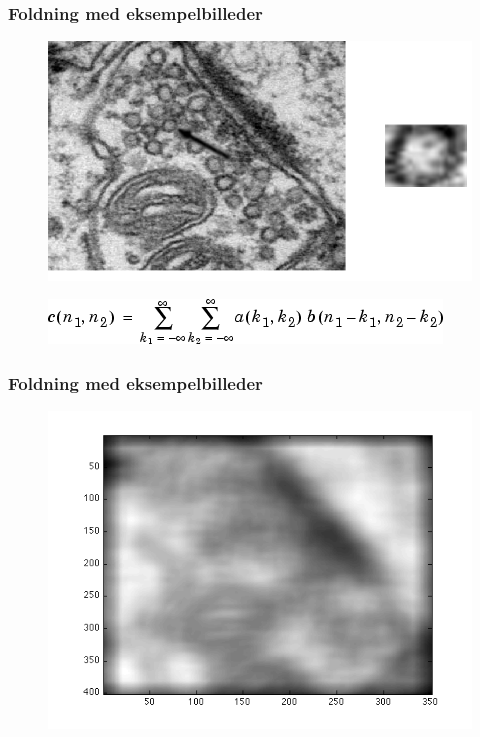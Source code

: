 \begin{frame}
\frametitle{Foldning med eksempelbilleder}
\begin{figure}[H]
	\centering
	\includegraphics[scale=0.4]{img/finalmethod/cell2.png}
\end{figure}
\begin{figure}[H]
	\centering
	\includegraphics[scale=0.6]{img/finalmethod/math_c5.png}
\end{figure}
\end{frame}

\begin{frame}
\frametitle{Foldning med eksempelbilleder}
\begin{figure}[H]
	\centering
	\includegraphics[scale=0.6]{img/finalmethod/convolve.png}
\end{figure}
\end{frame}

